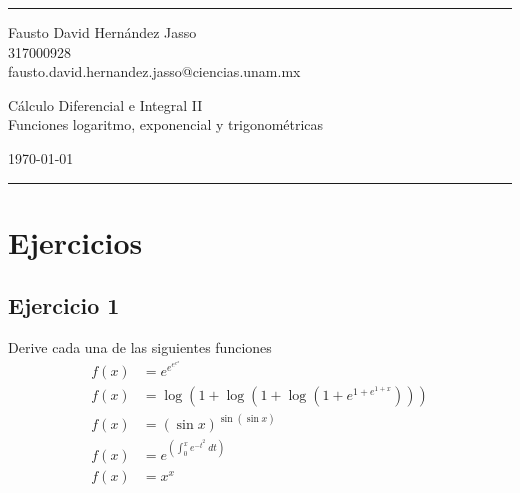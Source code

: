\documentclass[a4paper]{article}
\begin{document}

\fancyhead[C]{}
\hrule \medskip %
\begin{minipage}{0.35\textwidth} 
\raggedright
\footnotesize
Fausto David Hernández Jasso \hfill\\   
317000928 \hfill\\
fausto.david.hernandez.jasso@ciencias.unam.mx
\end{minipage}
\begin{minipage}{0.4\textwidth} 
\centering 
\large 
Cálculo Diferencial e Integral II\\ 
\normalsize 
Funciones logaritmo, exponencial y trigonométricas\\ 
\end{minipage}
\begin{minipage}{0.24\textwidth} 
\raggedleft
\today\hfill\\
\end{minipage}
\medskip\hrule 
\bigskip
\section{Ejercicios}
\subsection{Ejercicio 1}
\noindent
Derive cada una de las siguientes funciones
\begin{align*}
    f(x) &= e^{e^{e^{e^{x}}}} \\
    f(x) &= \log{\left(1 + \log{\left(1 + \log{\left(1 + e^{1 + e^{1 + x}}\right)}\right)}\right)} \\
    f(x) &= \left(\sin{x}\right)^{\sin{\left(\sin{x}\right)}} \\
    f(x) &= e^{\left(\int_{0}^{x} e^{-t^2} \ dt\right)} \\
    f(x) &= x^x
\end{align*}
\end{document}
